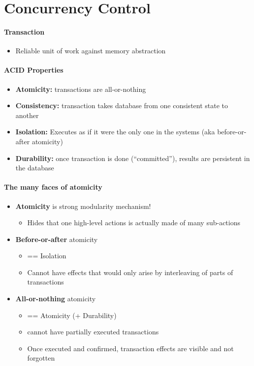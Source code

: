 \section{Concurrency Control}

\paragraph{Transaction}
\begin{itemize}
\item Reliable unit of work against memory abstraction
\end{itemize}

\paragraph{ACID Properties}
\begin{itemize}
\item \textbf{Atomicity:} transactions are all-or-nothing
\item \textbf{Consistency:} transaction takes database from
  one consistent state to another
\item \textbf{Isolation:} Executes as if it were the only one in
  the systems (aka before-or-after atomicity)
\item \textbf{Durability:} once transaction is done (``committed''),
  results are persistent in the database
\end{itemize}

\paragraph{The many faces of atomicity}
\begin{itemize}
\item \textbf{Atomicity} is strong modularity mechanism!
  \begin{itemize}
  \item Hides that one high-level actions is actually made of
    many sub-actions
  \end{itemize}

\item \textbf{Before-or-after} atomicity
  \begin{itemize}
  \item == Isolation
  \item Cannot have effects that would only arise by
    interleaving of parts of transactions
  \end{itemize}

\item \textbf{All-or-nothing} atomicity
  \begin{itemize}
  \item == Atomicity (+ Durability)
  \item cannot have partially executed transactions
  \item Once executed and confirmed, transaction effects are
    visible and not forgotten
  \end{itemize}
\end{itemize}


